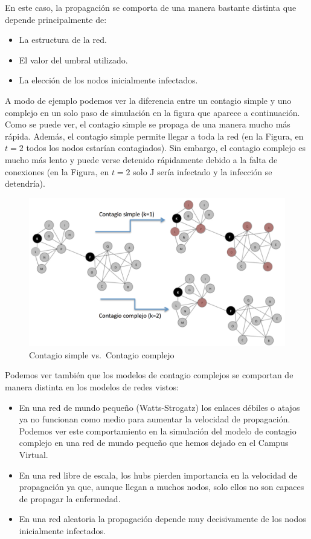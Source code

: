 \documentclass[]{article}
\begin{document}
En este caso, la propagación se comporta de una manera bastante distinta
que depende principalmente de:

\begin{itemize}
\itemsep1pt\parskip0pt
\item
  La estructura de la red.
\item
  El valor del umbral utilizado.
\item
  La elección de los nodos inicialmente infectados.
\end{itemize}

A modo de ejemplo podemos ver la diferencia entre un contagio simple y
uno complejo en un solo paso de simulación en la figura que aparece a
continuación. Como se puede ver, el contagio simple se propaga de una
manera mucho más rápida. Además, el contagio simple permite llegar a
toda la red (en la Figura, en \(t=2\) todos los nodos estarían
contagiados). Sin embargo, el contagio complejo es mucho más lento y
puede verse detenido rápidamente debido a la falta de conexiones (en la
Figura, en \(t=2\) solo J sería infectado y la infección se detendría).

\begin{figure}[htbp]
\centering
\includegraphics{../images/tema08/contagioComplejo.png}
\caption{Contagio simple vs.~Contagio complejo}
\end{figure}

Podemos ver también que los modelos de contagio complejos se comportan
de manera distinta en los modelos de redes vistos:

\begin{itemize}
\itemsep1pt\parskip0pt
\item
  En una red de mundo pequeño (Watts-Strogatz) los enlaces débiles o
  atajos ya no funcionan como medio para aumentar la velocidad de
  propagación. Podemos ver este comportamiento en la simulación del
  modelo de contagio complejo en una red de mundo pequeño que hemos
  dejado en el Campus Virtual.
\item
  En una red libre de escala, los hubs pierden importancia en la
  velocidad de propagación ya que, aunque llegan a muchos nodos, solo
  ellos no son capaces de propagar la enfermedad.
\item
  En una red aleatoria la propagación depende muy decisivamente de los
  nodos inicialmente infectados.
\end{itemize}
\end{document}
